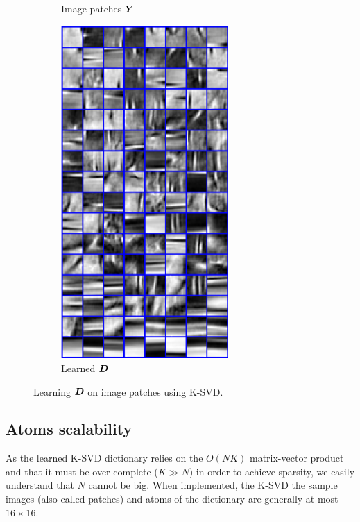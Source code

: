 \begin{figure}[!ht]
\begin{subfigure}[b]{0.29\textwidth}
	\caption{Image patches $\bm{Y}$}
\end{subfigure}
\begin{subfigure}[b]{0.29\textwidth}\centering
	\includegraphics[width=0.7\textwidth]{figures/ksvd/dictionary.pdf}
	\caption{Learned $\bm{D}$}\label{fig_ksvd_dict}
\end{subfigure}
\caption{Learning $\bm{D}$ on image patches using K-SVD.}\label{fig_ksvd_dict}
\end{figure}




\subsection{Atoms scalability}
As the learned K-SVD dictionary relies on the $O(NK)$ matrix-vector product and that it must be over-complete ($K \gg N$) in order to achieve sparsity, we easily understand that $N$ cannot be big. When implemented, the K-SVD the sample images (also called patches) and atoms of the dictionary are generally at most $16 \times 16$. 

